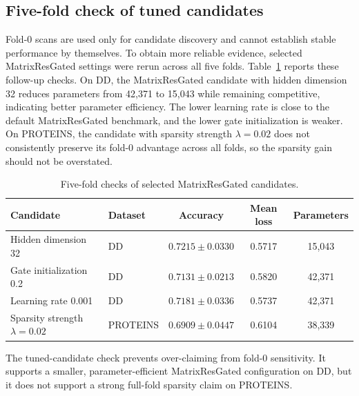 \subsection{Five-fold check of tuned candidates}

Fold-0 scans are used only for candidate discovery and cannot establish stable performance by themselves. To obtain more reliable evidence, selected MatrixResGated settings were rerun across all five folds. Table~\ref{tab:tuned_candidates} reports these follow-up checks. On DD, the MatrixResGated candidate with hidden dimension 32 reduces parameters from 42,371 to 15,043 while remaining competitive, indicating better parameter efficiency. The lower learning rate is close to the default MatrixResGated benchmark, and the lower gate initialization is weaker. On PROTEINS, the candidate with sparsity strength \(\lambda=0.02\) does not consistently preserve its fold-0 advantage across all folds, so the sparsity gain should not be overstated.

\begin{table}[!htbp]
\centering
\small
\caption{Five-fold checks of selected MatrixResGated candidates.}
\label{tab:tuned_candidates}
\begin{tabular}{l l c c c}
\toprule
Candidate & Dataset & Accuracy & Mean loss & Parameters \\
\midrule
Hidden dimension 32 & DD & \(\mathbf{0.7215\pm0.0330}\) & 0.5717 & 15,043 \\
Gate initialization 0.2 & DD & \(0.7131\pm0.0213\) & 0.5820 & 42,371 \\
Learning rate 0.001 & DD & \(0.7181\pm0.0336\) & 0.5737 & 42,371 \\
Sparsity strength \(\lambda=0.02\) & PROTEINS & \(0.6909\pm0.0447\) & 0.6104 & 38,339 \\
\bottomrule
\end{tabular}
\end{table}

The tuned-candidate check prevents over-claiming from fold-0 sensitivity. It supports a smaller, parameter-efficient MatrixResGated configuration on DD, but it does not support a strong full-fold sparsity claim on PROTEINS.
